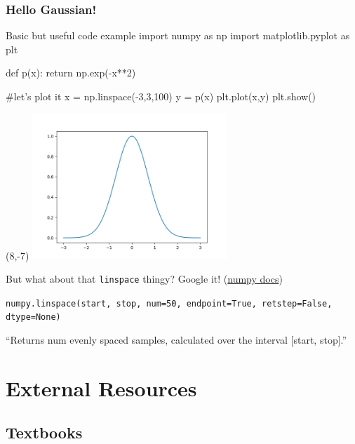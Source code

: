 \documentclass[hyperref={colorlinks=true}]{beamer}
\begin{document}
\begin{frame}[fragile]
  \frametitle{Hello Gaussian!}

\begin{ucpythonblock}{Basic but useful code example}
import numpy as np
import matplotlib.pyplot as plt

def p(x):
    return np.exp(-x**2)
    
#let's plot it
x = np.linspace(-3,3,100)
y = p(x)
plt.plot(x,y)
plt.show()
\end{ucpythonblock}
  
  \pause

  \begin{textblock}{12}(8,-7)
    \includegraphics[width=0.55\textwidth]{Gaussian.png}
  \end{textblock}  
  
  \pause
  
  But what about that \texttt{linspace} thingy? Google it! (\href{https://docs.scipy.org/doc/numpy-1.15.0/reference/generated/numpy.linspace.html}{numpy docs})
  
  \texttt{numpy.linspace(start, stop, num=50, endpoint=True, retstep=False, dtype=None)}
  
  ``Returns num evenly spaced samples, calculated over the interval [start, stop].''
  
\end{frame}

\section[External Resources]{External Resources}

\subsection[Textbooks]{Textbooks}
\end{document}
